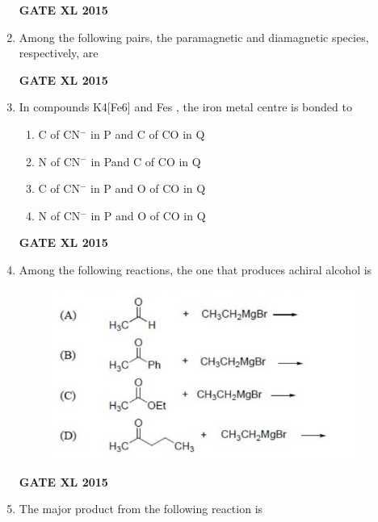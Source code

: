 \documentclass[journal,12pt,onecolumn]{IEEEtran}
\begin{document}
\begin{enumerate}
    \begin{enumerate}
    \end{enumerate}
\hfill{\textbf{GATE XL 2015}}
\item Among the following pairs, the paramagnetic and diamagnetic species, respectively, are
    \begin{enumerate}
    \end{enumerate}
\hfill{\textbf{GATE XL 2015}}
\item In compounds K4[Fe6]  and Fes , the iron metal centre is bonded to
    \begin{enumerate}
            \item C of CN$^-$ in P and C of CO in Q
            \item N of CN$^-$ in Pand C of CO in Q
            \item C of CN$^-$ in P and O of CO in Q
            \item N of CN$^-$ in P and O of CO in Q
    \end{enumerate}
\hfill{\textbf{GATE XL 2015}}
\item  Among the following reactions, the one that produces achiral alcohol  is

	
	\begin{figure}[h!]
		\centering
    \includegraphics[width=10cm]{21}
		    \caption*{}
		\label{fig:Q21}
	\end{figure}
\hfill{\textbf{GATE XL 2015}}
\item The major product from the following reaction is
    

\end{enumerate}
\end{document}
